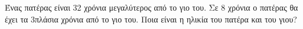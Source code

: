 Ένας πατέρας είναι 32 χρόνια μεγαλύτερος από το γιο του. Σε 8 χρόνια ο πατέρας θα έχει τα 3πλάσια χρόνια από το γιο του. Ποια είναι η ηλικία του πατέρα και του γιου?
